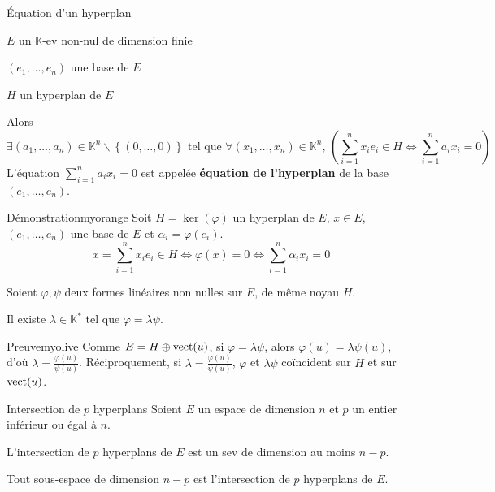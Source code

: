     \begin{coro}{Équation d’un hyperplan}{}
        \begin{soient}
            \item $E$ un $\mathbb{K}$-ev non-nul de dimension finie
            \item $(e_1, \ldots, e_n)$ une base de $E$
            \item $H$ un hyperplan de $E$
        \end{soient}
        Alors
        \[ \exists (a_1,\ldots,a_n) \in \mathbb{K}^n \backslash \left\{ (0, \ldots, 0) \right\} \text{ tel que } \forall (x_1,\ldots,x_n) \in \mathbb{K}^n, \, \left( \sum\limits_{i=1}^n x_i e_i \in H \iff \sum\limits_{i=1}^n a_i x_i = 0 \right) \]
        L’équation $ \sum\limits_{i=1}^n a_i x_i = 0$ est appelée \textbf{équation de l’hyperplan} de la base $(e_1,\ldots,e_n)$.
    \end{coro}
    
    \begin{demo}{Démonstration}{myorange}
        Soit $H = \ker(\varphi)$ un hyperplan de $E$, $x \in E$, $(e_1,\ldots,e_n)$ une base de $E$ et $\alpha_i = \varphi(e_i)$.
        \[ x = \sum_{i=1}^{n} x_i e_i \in H \iff \varphi(x) = 0 \iff \sum_{i=1}^{n} \alpha_i x_i = 0 \]
    \end{demo}

    \begin{prop}{}{}
        Soient $\varphi, \psi$ deux formes linéaires non nulles sur $E$, de même noyau $H$. 

        Il existe $\lambda \in \mathbb{K}^*$ tel que $\varphi = \lambda \psi$.
    \end{prop}

    \begin{demo}{Preuve}{myolive}
        Comme $E = H \oplus \operatorname{vect}(u)$, si $\varphi = \lambda \psi$, alors $\varphi(u) = \lambda \psi(u)$, d’où $\lambda = \frac{\varphi(u)}{\psi(u)}$. Réciproquement, si $\lambda = \frac{\varphi(u)}{\psi(u)}$, $\varphi$ et $\lambda \psi$ coïncident sur $H$ et sur $\operatorname{vect}(u)$.
    \end{demo}

    \begin{prop}{Intersection de $p$ hyperplans}{}
        Soient $E$ un espace de dimension $n$ et $p$ un entier inférieur ou égal à $n$.
        \begin{alors}
            \item L’intersection de $p$ hyperplans de $E$ est un sev de dimension au moins $n-p$.
            \item Tout sous-espace de dimension $n-p$ est l’intersection de $p$ hyperplans de $E$.
        \end{alors}
    \end{prop}

